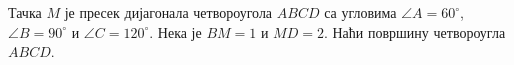 Тачка $M$ је пресек дијагонала четвороугола $ABCD$ са угловима 
$\angle A = 60^{\circ}$, $\angle B = 90^{\circ}$ и $\angle C = 120^{\circ}$.
Нека је $BM = 1$ и $MD = 2$. 
Наћи површину четвороугла $ABCD$.

\solution

